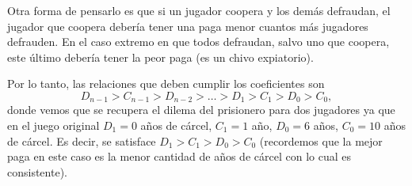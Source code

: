 \documentclass[letterpaper,12pt]{article}
\theoremstyle{plain}
\begin{document}
Otra forma de pensarlo es que si un jugador coopera y los demás defraudan, el jugador que coopera debería tener una paga menor cuantos más jugadores defrauden. En el caso extremo en que todos defraudan, salvo uno que coopera, este último debería tener la peor paga (es un chivo expiatorio). 

Por lo tanto, las relaciones que deben cumplir los coeficientes son
\begin{equation}
    D_{n-1} > C_{n-1} > D_{n-2} > \dots > D_1 > C_1 > D_0 > C_0,
\end{equation}
donde vemos que se recupera el dilema del prisionero para dos jugadores ya que en el juego original $D_1 = 0$ años de cárcel, $C_1 = 1$ año, $D_0 = 6$ años, $C_0 = 10$ años de cárcel. Es decir, se satisface $D_1 > C_1 > D_0 > C_0$ (recordemos que la mejor paga en este caso es la menor cantidad de años de cárcel con lo cual es consistente).


\end{document}
